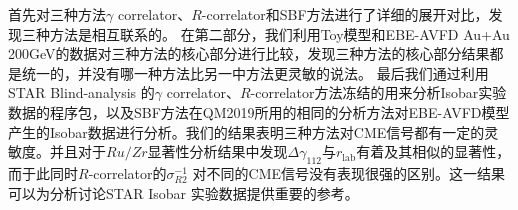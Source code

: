 首先对三种方法$ \gamma$ correlator、$R$-correlator和SBF方法进行了详细的展开对比，发现三种方法是相互联系的。
在第二部分，我们利用Toy模型和EBE-AVFD Au+Au 200GeV的数据对三种方法的核心部分进行比较，发现三种方法的核心部分结果都是统一的，并没有哪一种方法比另一中方法更灵敏的说法。
最后我们通过利用STAR Blind-analysis 的$ \gamma$ correlator、$R$-correlator方法冻结的用来分析Isobar实验数据的程序包，以及SBF方法在QM2019所用的相同的分析方法对EBE-AVFD模型产生的Isobar数据进行分析。我们的结果表明三种方法对CME信号都有一定的灵敏度。并且对于$Ru/Zr$显著性分析结果中发现$\Delta \gamma_{112}$与$r_{\mathrm{lab}}$有着及其相似的显著性，而于此同时$R$-correlator的$ \sigma_{R2}^{-1}$ 对不同的CME信号没有表现很强的区别。这一结果可以为分析讨论STAR Isobar 实验数据提供重要的参考。


